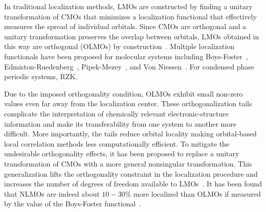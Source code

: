 \documentclass[aps,prl,reprint,amsmath,amssymb]{revtex4-1}
\begin{document}
In traditional localization methods, LMOs are constructed by finding a unitary transformation of CMOs that minimizes a localization functional that effectively measures the spread of individual orbitals. 
Since CMOs are orthogonal and a unitary transformation preserves the overlap between orbitals, LMOs obtained in this way are orthogonal (OLMOs) by construction~\cite{weinstein1971localized}.
Multiple localization functionals have been proposed for molecular systems including Boys-Foster~\cite{boys1960construction}, Edmiston-Ruedenberg~\cite{bytautas2002electron, bytautas2003split, edmiston1963localized}, Pipek-Mezey~\cite{pipek1989a_fast}, and Von Niessen~\cite{niessen1972density}. For condensed phase periodic systems, RZK. ~\cite{marzari2012maximally}

Due to the imposed orthogonality condition, OLMOs exhibit small non-zero values even far away from the localization center. 
These orthogonalization tails complicate the interpretation of chemically relevant electronic-structure information and make its transferability from one system to another more difficult. More importantly, the tails reduce orbital locality making orbital-based local correlation methods less computationally efficient.
%
% 
To mitigate the undesirable orthogonality effects, it has been proposed to replace a unitary transformation of CMOs with a more general nonsingular transformation. This generalization lifts the orthogonality constraint in the localization procedure and increases the number of degrees of freedom available to LMOs~\cite{anderson1968self, diner1968fully, magnasco1974localized, payne1977hartree, mehler1977self, feng2004An_efficient, cui2010efficient}. %
It has been found that NLMOs are indeed about $10-30 \%$ more localized than OLMOs if measured by the value of the Boys-Foster functional~\cite{feng2004An_efficient, liu2000nonorthogonal}. %
\end{document}
